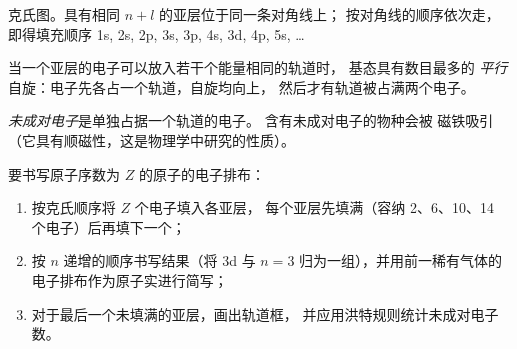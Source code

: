 \begin{omfigure}

{\small 克氏图。具有相同 $n + l$ 的亚层位于同一条对角线上；
按对角线的顺序依次走，即得填充顺序
1s, 2s, 2p, 3s, 3p, 4s, 3d, 4p, 5s, \dots}
\end{omfigure}

\begin{proposition}[洪特规则]\label{prop:b1:quantum-numbers:hund}
当一个亚层的电子可以放入若干个能量相同的轨道时，
基态具有数目最多的
\emph{平行}自旋：电子先各占一个轨道，自旋均向上，
然后才有轨道被占满两个电子。
\end{proposition}
\admitted

\begin{definition}[未成对电子]\label{def:b1:quantum-numbers:unpaired}
\emph{未成对电子}是单独占据一个轨道的电子。
含有未成对电子的物种会被
磁铁吸引（它具有顺磁性，这是物理学中研究的性质）。
\end{definition}

\begin{method}[书写基态电子排布]\label{met:b1:quantum-numbers:configuration}
要书写原子序数为 $Z$ 的原子的电子排布：
\begin{enumerate}
  \item 按克氏顺序将 $Z$ 个电子填入各亚层，
        每个亚层先填满（容纳 2、6、10、14 个电子）后再填下一个；
  \item 按 $n$ 递增的顺序书写结果（将 3d
        与 $n = 3$ 归为一组），并用前一稀有气体的
        电子排布作为原子实进行简写；
  \item 对于最后一个未填满的亚层，画出轨道框，
        并应用洪特规则统计未成对电子数。
\end{enumerate}
\end{method}

